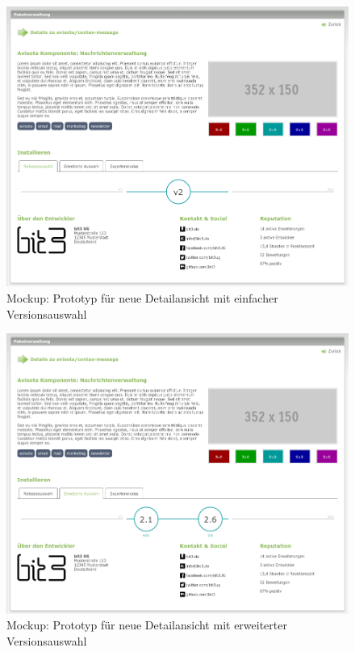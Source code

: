 \documentclass[
paper=a4,
draft=false,%
fontsize=10pt%
]{scrartcl}
\begin{document}
\begin{figure}[p]
  \centering
  \includegraphics[width=\textwidth]{bilder/mockup-details-1}
  \caption{Mockup: Prototyp für neue Detailansicht mit einfacher Versionsauswahl}
\end{figure}

\begin{figure}[p]
  \centering
  \includegraphics[width=\textwidth]{bilder/mockup-details-2}
  \caption{Mockup: Prototyp für neue Detailansicht mit erweiterter Versionsauswahl}
\end{figure}
\end{document}
